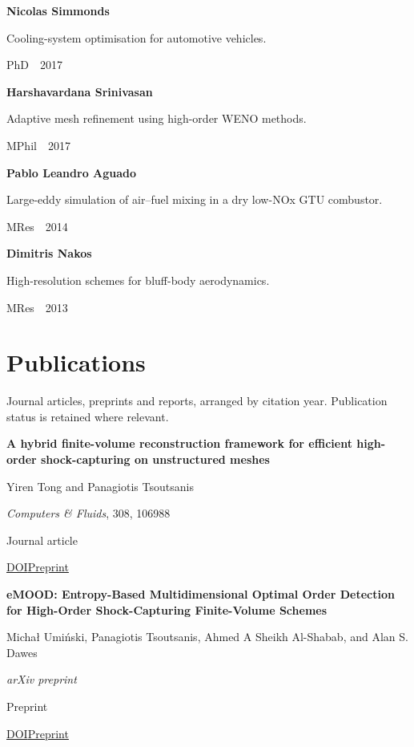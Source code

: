 \documentclass[11pt,a4paper]{article}
\newcommand{\cvsection}[1]{%
  \par\Needspace{10\baselineskip}\section*{#1}\markboth{#1}{}}
\newlength{\cventrysep}
\newenvironment{cventry}{%
  \par\noindent\begin{minipage}{\linewidth}
  \RaggedRight\fontsize{9.8}{12.5}\selectfont
}{\end{minipage}\par\addvspace{\cventrysep}}
\newcommand{\cvtitle}[1]{{\bfseries #1\par}\vspace{1pt}}
\newcommand{\cvdetail}[1]{{#1\par}\vspace{1pt}}
\newcommand{\cvmeta}[1]{{\fontsize{9}{11.5}\selectfont\color{Muted}#1\par}\vspace{1pt}}
\newcommand{\cvlinks}[1]{{\fontsize{9}{11.5}\selectfont #1\par}}
\newcommand{\cvyear}[1]{{\color{Teal}\bfseries\fontsize{11}{13}\selectfont #1\par}\vspace{6pt}}
\begin{document}
\begin{cventry}
\cvtitle{Nicolas Simmonds}
\cvdetail{Cooling-system optimisation for automotive vehicles.}
\cvmeta{PhD \,\textperiodcentered{}\, 2017}
\end{cventry}

\begin{cventry}
\cvtitle{Harshavardana Srinivasan}
\cvdetail{Adaptive mesh refinement using high-order WENO methods.}
\cvmeta{MPhil \,\textperiodcentered{}\, 2017}
\end{cventry}

\begin{cventry}
\cvtitle{Pablo Leandro Aguado}
\cvdetail{Large-eddy simulation of air--fuel mixing in a dry low-NOx GTU combustor.}
\cvmeta{MRes \,\textperiodcentered{}\, 2014}
\end{cventry}

\begin{cventry}
\cvtitle{Dimitris Nakos}
\cvdetail{High-resolution schemes for bluff-body aerodynamics.}
\cvmeta{MRes \,\textperiodcentered{}\, 2013}
\end{cventry}

\clearpage
\cvsection{Publications}

{\small\color{Muted}Journal articles, preprints and reports, arranged by citation year. Publication status is retained where relevant.}


\begin{cventry}
\cvyear{2026}
\cvtitle{A hybrid finite-volume reconstruction framework for efficient high-order shock-capturing on unstructured meshes}
\cvdetail{Yiren Tong and Panagiotis Tsoutsanis}
\cvmeta{\textit{Computers \& Fluids}, 308, 106988\par Journal article}
\cvlinks{\href{https://doi.org/10.1016/j.compfluid.2026.106988}{DOI}\enspace\textperiodcentered{}\enspace \href{https://arxiv.org/abs/2510.25906}{Preprint}}
\end{cventry}

\begin{cventry}
\cvtitle{eMOOD: Entropy-Based Multidimensional Optimal Order Detection for High-Order Shock-Capturing Finite-Volume Schemes}
\cvdetail{Michał Umiński, Panagiotis Tsoutsanis, Ahmed A Sheikh Al-Shabab, and Alan S. Dawes}
\cvmeta{\textit{arXiv preprint}\par Preprint}
\cvlinks{\href{https://doi.org/10.48550/arXiv.2610.20133}{DOI}\enspace\textperiodcentered{}\enspace \href{https://arxiv.org/abs/2610.20133}{Preprint}}
\end{cventry}
\end{document}
